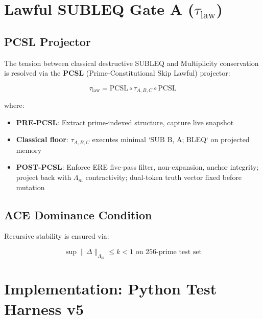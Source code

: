 \documentclass[11pt,a4paper]{article}
\begin{document}
\section{Lawful SUBLEQ Gate A ($\tau_{\text{law}}$)}

\subsection{PCSL Projector}

The tension between classical destructive SUBLEQ and Multiplicity conservation is resolved via the \textbf{PCSL} (Prime-Constitutional Skip Lawful) projector:

\begin{equation}\label{eq:pcsl}
\tau_{\text{law}} = \text{PCSL} \circ \tau_{A,B,C} \circ \text{PCSL}
\end{equation}

where:
\begin{itemize}
    \item \textbf{PRE-PCSL}: Extract prime-indexed structure, capture live snapshot
    \item \textbf{Classical floor}: $\tau_{A,B,C}$ executes minimal `SUB B, A; BLEQ` on projected memory
    \item \textbf{POST-PCSL}: Enforce ERE five-pass filter, non-expansion, anchor integrity; project back with $\Lambda_m$ contractivity; dual-token truth vector fixed before mutation
\end{itemize}

\subsection{ACE Dominance Condition}

Recursive stability is ensured via:

\begin{equation}\label{eq:ace}
\sup \|\Delta\|_{\Lambda_m} \leq k < 1 \text{ on 256-prime test set}
\end{equation}

\section{Implementation: Python Test Harness v5}
\end{document}
